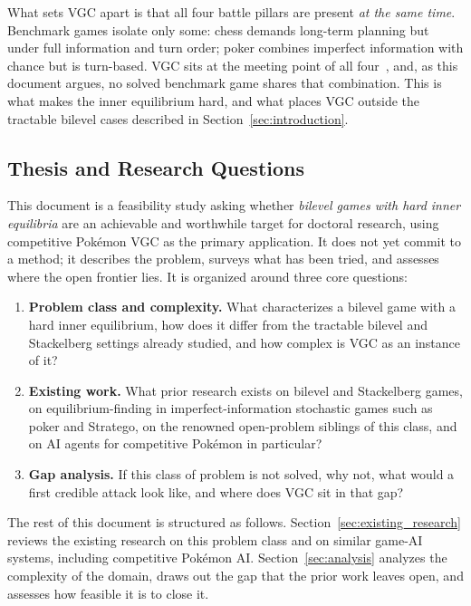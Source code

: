 What sets VGC apart is that all four battle pillars are present \emph{at the same
time}. Benchmark games isolate only some: chess demands long-term planning but
under full information and turn order; poker combines imperfect information with
chance but is turn-based. VGC sits at the meeting point of all
four~\cite{traylor_vgc}, and, as this document argues, no solved benchmark game
shares that combination. This is what makes the inner equilibrium hard, and what
places VGC outside the tractable bilevel cases described in
Section~\ref{sec:introduction}.

\subsection{Thesis and Research Questions}

This document is a feasibility study asking whether \emph{bilevel games with hard
inner equilibria} are an achievable and worthwhile target for doctoral research,
using competitive Pok\'{e}mon VGC as the primary application. It does not yet
commit to a method; it describes the problem, surveys what has been tried, and
assesses where the open frontier lies. It is organized around three core
questions:

\begin{enumerate}
  \item \textbf{Problem class and complexity.} What characterizes a bilevel game
        with a hard inner equilibrium, how does it differ from the tractable
        bilevel and Stackelberg settings already studied, and how complex is VGC
        as an instance of it?
  \item \textbf{Existing work.} What prior research exists on bilevel and
        Stackelberg games, on equilibrium-finding in imperfect-information
        stochastic games such as poker and Stratego, on the renowned open-problem
        siblings of this class, and on AI agents for competitive Pok\'{e}mon in
        particular?
  \item \textbf{Gap analysis.} If this class of problem is not solved, why not,
        what would a first credible attack look like, and where does VGC sit in
        that gap?
\end{enumerate}

The rest of this document is structured as follows.
Section~\ref{sec:existing_research} reviews the existing research on this problem
class and on similar game-AI systems, including competitive Pok\'{e}mon AI.
Section~\ref{sec:analysis} analyzes the complexity of the domain, draws out the
gap that the prior work leaves open, and assesses how feasible it is to close it.

\newpage
